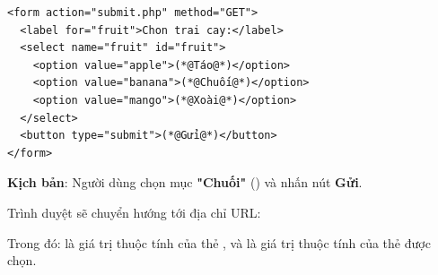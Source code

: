 \begin{codeWindow}
\begin{lstlisting}[language=HTML5]
<form action="submit.php" method="GET">
  <label for="fruit">Chon trai cay:</label>
  <select name="fruit" id="fruit">
    <option value="apple">(*@Táo@*)</option>
    <option value="banana">(*@Chuối@*)</option>
    <option value="mango">(*@Xoài@*)</option>
  </select>
  <button type="submit">(*@Gửi@*)</button>
</form>
\end{lstlisting}
\end{codeWindow}

\begin{tipBox}
\textbf{Kịch bản}: Người dùng chọn mục \textbf{"Chuối"} () và nhấn nút \textbf{Gửi}.
\par\vspace{4pt}
Trình duyệt sẽ chuyển hướng tới địa chỉ URL:
\begin{center}
\end{center}
Trong đó:  là giá trị thuộc tính  của thẻ , và  là giá trị thuộc tính  của thẻ  được chọn.
\end{tipBox}

